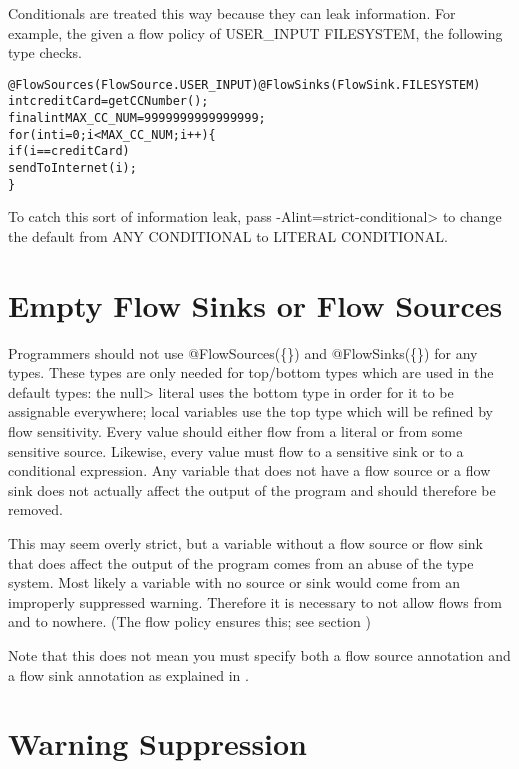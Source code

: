 Conditionals are treated this way because they can leak information. For example, the given a flow policy of  USER\_INPUT \flowsto{} FILESYSTEM, the following type checks.

\begin{alltt}
@FlowSources(FlowSource.USER_INPUT) @FlowSinks(FlowSink.FILESYSTEM)
int creditCard = getCCNumber();
final int MAX\_CC\_NUM = 9999999999999999;
for (int i = 0 ; i < MAX\_CC\_NUM ; i++)\{
   if (i == creditCard)
        sendToInternet(i);
\}
\end{alltt}

To catch this sort of information leak, pass
 \<-Alint=strict-conditional> to change the default from ANY \flowsto{} CONDITIONAL to 
 LITERAL \flowsto{} CONDITIONAL. 



\section{Empty Flow Sinks or Flow Sources\label{sec:emptyflow}}

Programmers should not use @FlowSources(\{\}) and @FlowSinks(\{\}) for
any types.
These types are only needed for top/bottom types which are used in the
default types: the \<null> literal uses the bottom type in order for
it to be assignable everywhere; local variables use the top type which
will be refined by flow sensitivity.
Every value should either flow from a literal or from some sensitive
source.  Likewise, every value must flow to a sensitive sink or to a
conditional expression.  Any variable that does not have a flow source
or a flow sink does not actually affect the output of the program and
should therefore be removed.
  
This may seem overly strict, but a variable without a flow source or
flow sink that does affect the output of the program comes from an
abuse of the type system.  Most likely a variable with no source or
sink would come from an improperly suppressed warning. Therefore it is
necessary to not allow flows from and to nowhere.  (The flow policy
ensures this; see section )

Note that this does not mean you must specify both a flow source
annotation and a flow sink annotation as explained in
. 

 
\section{Warning Suppression\label{sec:waringsuppression}}
 
